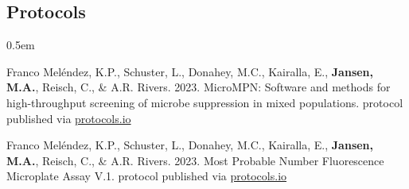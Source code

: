 \documentclass[12pt,a4paper]{article}
\begin{document}
	\subsection*{Protocols}
	\begin{description}
		\itemsep0.5em
		\item Franco Mel\'{e}ndez, K.P., Schuster, L., Donahey, M.C., Kairalla, E., \textbf{Jansen, M.A.}, Reisch, C., \& A.R. Rivers. 2023. MicroMPN: Software and methods for high-throughput screening of microbe suppression in mixed populations. protocol published via \href{dx.doi.org/10.17504/protocols.io.81wgbymenvpk/v1}{protocols.io}
		\item Franco Mel\'{e}ndez, K.P., Schuster, L., Donahey, M.C., Kairalla, E., \textbf{Jansen, M.A.}, Reisch, C., \& A.R. Rivers. 2023. Most Probable Number Fluorescence Microplate Assay V.1. protocol published via \href{dx.doi.org/10.17504/protocols.io.q26g7yqk1gwz/v1}{protocols.io}
	\end{description}
\end{document}
